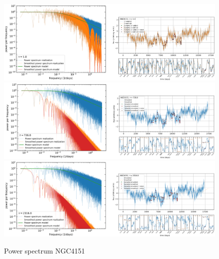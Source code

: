 \begin{figure}
\begin{center}
    {
  \includegraphics[width=\textwidth]{Figs/Chapter5/NGC4151/Screenshots/NGC4151_tau1_LC_spectrum.pdf} \\
  \includegraphics[width=\textwidth]{Figs/Chapter5/NGC4151/Screenshots/NGC4151_tau726_LC_spectrum.pdf} \\
  \includegraphics[width=\textwidth]{Figs/Chapter5/NGC4151/Screenshots/NGC4151_tau2316_LC_spectrum.pdf} \\
  \caption{Power spectrum NGC4151}
    \label{fig:power_spectra_1_NGC4151}
  }
\end{center}
\end{figure}

